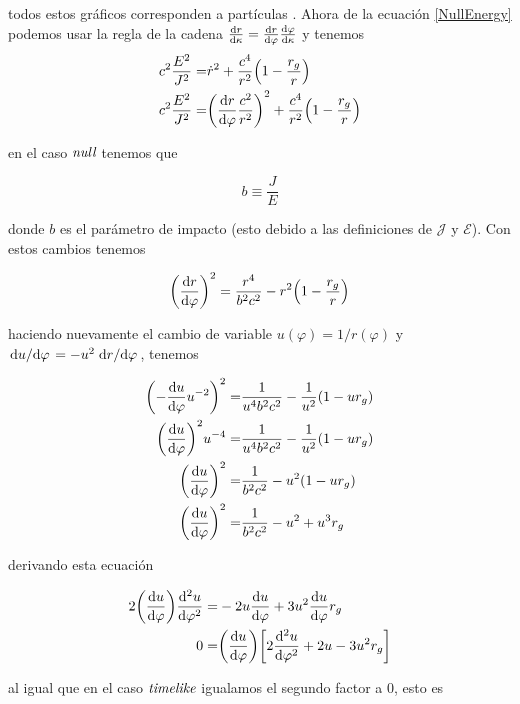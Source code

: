 \documentclass[../Main.tex]{subfiles}
\begin{document}
todos estos gráficos corresponden a partículas \tl. Ahora de la ecuación \eqref{NullEnergy} podemos usar la regla de la cadena $\dv{r}{\kappa}=\dv{r}{\varphi}\dv{\varphi}{\kappa}$ y tenemos
\begin{align*}
    c^{2}\dfrac{E^{2}}{J^{2}} = & \dot{r}^{2} + \dfrac{c^{4}}{r^{2}}\qty(1-\dfrac{r_{g}}{r}) \\
    c^{2}\dfrac{E^{2}}{J^{2}} = & \qty(\dv{r}{\varphi}\dfrac{c^{2}}{r^{2}})^{2} + \dfrac{c^{4}}{r^{2}}\qty(1-\dfrac{r_{g}}{r}) 
\end{align*}

en el caso $\textit{null}$ tenemos que

\begin{equation}
    b \equiv \dfrac{J}{E}
\end{equation}

donde $b$ es el parámetro de impacto (esto debido a las definiciones de $\mathscr{J}$ y $\mathscr{E}$). Con estos cambios tenemos

\begin{equation}
    \qty(\dv{r}{\varphi})^{2} = \dfrac{r^{4}}{b^{2}c^{2}}-r^{2}\qty(1-\dfrac{r_{g}}{r})
    \label{geodesicnullcuadratic}
\end{equation}

haciendo nuevamente el cambio de variable $u(\varphi)=1/r(\varphi)$ y $\dv*{u}{\varphi}= -u^{2}\dv*{r}{\varphi}$, tenemos

\begin{align*}
    \qty(-\dv{u}{\varphi}u^{-2})^{2} = & \dfrac{1}{u^{4}b^{2}c^{2}}-\dfrac{1}{u^{2}}\qty(1-ur_{g}) \\
    \qty(\dv{u}{\varphi})^{2}u^{-4} = & \dfrac{1}{u^{4}b^{2}c^{2}}-\dfrac{1}{u^{2}}\qty(1-ur_{g}) \\
    \qty(\dv{u}{\varphi})^{2} = & \dfrac{1}{b^{2}c^{2}}-u^{2}\qty(1-ur_{g}) \\
    \qty(\dv{u}{\varphi})^{2} = & \dfrac{1}{b^{2}c^{2}}-u^{2}+u^{3}r_{g}
\end{align*}

derivando esta ecuación

\begin{align*}
    2\qty(\dv{u}{\varphi})\dv[2]{u}{\varphi} = & -2u\dv{u}{\varphi} + 3u^{2}\dv{u}{\varphi}r_{g} \\
    0 = & \qty(\dv{u}{\varphi})\qty[2\dv[2]{u}{\varphi}+2u-3u^{2}r_{g}] \\
\end{align*}

al igual que en el caso $\textit{timelike}$ igualamos el segundo factor a 0, esto es
\end{document}
